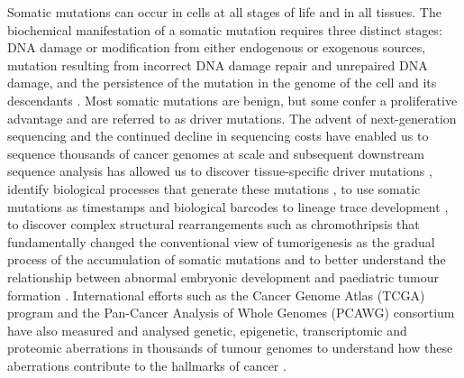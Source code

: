 Somatic mutations can occur in cells at all stages of life and in all tissues. The biochemical manifestation of a somatic mutation requires three distinct stages: DNA damage or modification from either endogenous or exogenous sources, mutation resulting from incorrect DNA damage repair and unrepaired DNA damage, and the persistence of the mutation in the genome of the cell and its descendants \cite{Stratton2009-of}. Most somatic mutations are benign, but some confer a proliferative advantage and are referred to as driver mutations. The advent of next-generation sequencing and the continued decline in sequencing costs have enabled us to sequence thousands of cancer genomes at scale and subsequent downstream sequence analysis has allowed us to discover tissue-specific driver mutations \cite{Martinez-Jimenez2020-kn}, identify biological processes that generate these mutations \cite{Alexandrov2013-kg}, to use somatic mutations as timestamps and biological barcodes to lineage trace development \cite{Behjati2014-gb}, to discover complex structural rearrangements such as chromothripsis \cite{Stephens2011-gj} that fundamentally changed the conventional view of tumorigenesis as the gradual process of the accumulation of somatic mutations \cite{Doll1954-of, Knudson1971-fg} and to better understand the relationship between abnormal embryonic development and paediatric tumour formation \cite{Marshall2014-ec}. International efforts such as the Cancer Genome Atlas (TCGA) program \cite{Weinstein2013-ko} and the Pan-Cancer Analysis of Whole Genomes (PCAWG) consortium \cite{ICGCTCGA_Pan-Cancer_Analysis_of_Whole_Genomes_Consortium2020-ts} have also measured and analysed genetic, epigenetic, transcriptomic and proteomic aberrations in thousands of tumour genomes to understand how these aberrations contribute to the hallmarks of cancer \cite{Hanahan2000-dp, Hanahan2011-zr}. 

